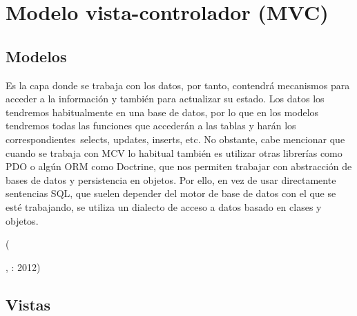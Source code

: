 \section{Modelo vista-controlador (MVC)}
\subsection{Modelos}

\begin{center}
  \begin{minipage}{0.9\linewidth}
    \vspace{5pt}%
    {\small

    Es la capa donde se trabaja con los datos, por tanto, contendrá mecanismos para acceder a la información y también para actualizar su estado. Los datos los tendremos habitualmente en una base de datos, por lo que en los modelos tendremos todas las funciones que accederán a las tablas y harán los correspondientes selects, updates, inserts, etc.
    No obstante, cabe mencionar que cuando se trabaja con MCV lo habitual también es utilizar otras librerías como PDO o algún ORM como Doctrine, que nos permiten trabajar con abstracción de bases de datos y persistencia en objetos. Por ello, en vez de usar directamente sentencias SQL, que suelen depender del motor de base de datos con el que se esté trabajando, se utiliza un dialecto de acceso a datos basado en clases y objetos.
    }
    \begin{flushright}
      (\author{Gutiérrez Javier.},
      : 2012)
    \end{flushright}
      \vspace{5pt}%
  \end{minipage}
\end{center}



\subsection{Vistas}

